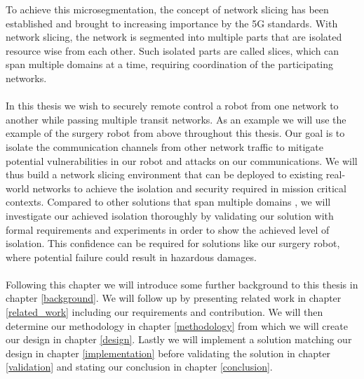To achieve this \gls{microsegmentation}, the concept of network slicing \cite{slicing} has been established and brought to increasing importance by the 5G standards. With network slicing, the network is segmented into multiple parts that are isolated resource wise from each other. Such isolated parts are called slices, which can span multiple domains at a time, requiring coordination of the participating networks.

\paragraph{} In this thesis we wish to securely remote control a robot from one network to another while passing multiple transit networks. As an example we will use the example of the surgery robot from above throughout this thesis. Our goal is to isolate the communication channels from other network traffic to mitigate potential vulnerabilities in our robot and attacks on our communications. We will thus build a network slicing environment that can be deployed to existing real-world networks to achieve the isolation and security required in mission critical contexts. Compared to other solutions that span multiple domains \cite{MD1,MD2,MD3,MD4,MD5}, we will investigate our achieved isolation thoroughly by validating our solution with formal requirements and experiments in order to show the achieved level of isolation. This confidence can be required for solutions like our surgery robot, where potential failure could result in hazardous damages.

\paragraph{} Following this chapter we will introduce some further background to this thesis in chapter \ref{background}. We will follow up by presenting related work in chapter \ref{related_work} including our requirements and contribution. We will then determine our methodology in chapter \ref{methodology} from which we will create our design in chapter \ref{design}. Lastly we will implement a solution matching our design in chapter \ref{implementation} before validating the solution in chapter \ref{validation} and stating our conclusion in chapter \ref{conclusion}.
